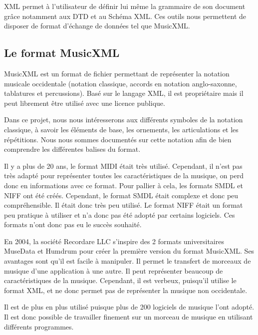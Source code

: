 \par
XML permet à l'utilisateur de définir lui même la grammaire de son document grâce notamment aux DTD et au Schéma XML. Ces outils nous permettent de disposer de format d’échange de données tel que MusicXML.



\subsection{Le format MusicXML}

MusicXML \cite{musicxml} est un format de fichier permettant de représenter la notation musicale occidentale (notation classique, accords en notation anglo-saxonne, tablatures et percussions). Basé sur le langage XML, il est propriétaire mais il peut librement être utilisé avec une licence publique.

\par
Dans ce projet, nous nous intéresserons aux différents symboles de la notation classique, à savoir les éléments de base, les ornements, les articulations et les répétitions. Nous nous sommes documentés sur cette notation \cite{apprendre_solfege} afin de bien comprendre les différentes balises du format.


\par
Il y a plus de 20 ans, le format MIDI était très utilisé. Cependant, il n’est pas très adapté pour représenter toutes les caractéristiques de la musique, on perd donc en informations avec ce format. Pour pallier à cela, les formats SMDL et NIFF ont été créés. Cependant, le format SMDL était complexe et donc peu compréhensible. Il était donc très peu utilisé. Le format NIFF était un format peu pratique à utiliser et n’a donc pas été adopté par certains logiciels. Ces formats n’ont donc pas eu le succès souhaité.

\par
En 2004, la société Recordare LLC s’inspire des 2 formats universitaires MuseData et Humdrum pour créer la première version du format MusicXML. Ses avantages sont qu’il est facile à manipuler. Il permet le transfert de morceaux de musique d’une application à une autre. Il peut représenter beaucoup de caractéristiques de la musique. Cependant, il est verbeux, puisqu'il utilise le format XML, et ne donc permet pas de représenter la musique non occidentale.

\par
Il est de plus en plus utilisé puisque plus de 200 logiciels de musique l’ont adopté. Il est donc possible de travailler finement sur un morceau de musique en utilisant différents programmes.


